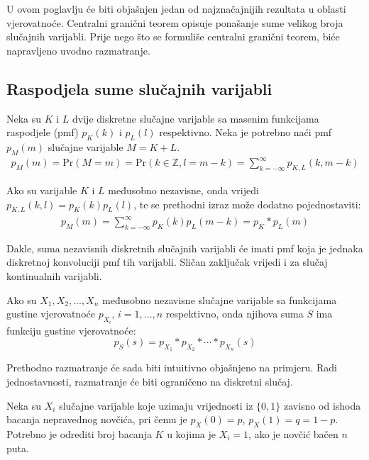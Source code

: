 U ovom poglavlju će biti objašnjen jedan od najznačajnijih rezultata u oblasti
vjerovatnoće. Centralni granični teorem opisuje ponašanje sume velikog broja
slučajnih varijabli. Prije nego što se formuliše centralni granični teorem, biće
napravljeno uvodno razmatranje.

\subsection{Raspodjela sume slučajnih varijabli}

Neka su $K$ i $L$ dvije diskretne slučajne varijable sa masenim funkcijama
raspodjele (pmf) $p_K(k)$ i $p_L(l)$ respektivno. Neka je potrebno naći pmf
$p_M(m)$ slučajne varijable $M=K+L$.
%
\newcommand{\pr}{\text{Pr}}
\begin{align*}
  p_M(m) = \pr(M=m) = \pr(k\in\mathbb{Z}, l=m-k)
  = \sum_{k=-\infty}^{\infty} p_{K,L}(k,m-k)
\end{align*}

Ako su varijable $K$ i $L$ međusobno nezavisne, onda vrijedi $p_{K,L}(k,l) =
p_K(k)p_L(l)$, te se prethodni izraz može dodatno pojednostaviti:
%
\begin{align*}
  p_M(m) = \sum_{k=-\infty}^{\infty} p_K(k)p_L(m-k) = p_K * p_L (m)
\end{align*}

Dakle, suma nezavisnih diskretnih slučajnih varijabli će imati pmf koja je
jednaka diskretnoj konvoluciji pmf tih varijabli. Sličan zaključak vrijedi i za
slučaj kontinualnih varijabli.

\begin{theorem} %

  Ako su $X_1,X_2,...,X_n$ međusobno nezavisne slučajne varijable sa funkcijama
  gustine vjerovatnoće $p_{X_i}$, $i=1,...,n$ respektivno, onda njihova suma $S$
  ima funkciju gustine vjerovatnoće:
  $$p_S(s) = p_{X_1} * p_{X_2} * \cdots * p_{X_n} (s)$$

\end{theorem}

Prethodno razmatranje će sada biti intuitivno objašnjeno na primjeru.  Radi
jednostavnosti, razmatranje će biti ograničeno na diskretni slučaj.

\begin{exmp} \label{ex:novcic}
  
Neka su $X_i$ slučajne varijable koje uzimaju vrijednosti iz $\{0,1\}$ zavisno
od ishoda bacanja nepravednog novčića, pri čemu je $p_X(0)= p$, $p_X(1)=q=1-p$.
Potrebno je odrediti broj bacanja $K$ u kojima je $X_i=1$, ako je novčić bačen
$n$ puta.

\end{exmp}

